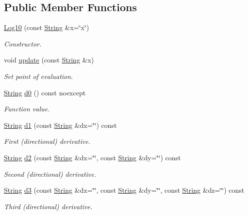 \subsection*{Public Member Functions}
\begin{DoxyCompactItemize}
\item 
\hyperlink{structFunG_1_1stringify_1_1Log10_adc0f9f883d5440b9b830de1fdb829d62}{Log10} (const \hyperlink{structFunG_1_1String}{String} \&x=\char`\"{}x\char`\"{})
\begin{DoxyCompactList}\small\item\em Constructor. \end{DoxyCompactList}\item 
void \hyperlink{structFunG_1_1stringify_1_1Log10_aaedc5f1160972edcc2b482b724aee82c}{update} (const \hyperlink{structFunG_1_1String}{String} \&x)
\begin{DoxyCompactList}\small\item\em Set point of evaluation. \end{DoxyCompactList}\item 
\hyperlink{structFunG_1_1String}{String} \hyperlink{structFunG_1_1stringify_1_1Log10_a839d0fc542d77763aedd53de85d44def}{d0} () const noexcept
\begin{DoxyCompactList}\small\item\em Function value. \end{DoxyCompactList}\item 
\hyperlink{structFunG_1_1String}{String} \hyperlink{structFunG_1_1stringify_1_1Log10_a9fcef111ed931e1f5172bda7d43618dd}{d1} (const \hyperlink{structFunG_1_1String}{String} \&dx=\char`\"{}\char`\"{}) const 
\begin{DoxyCompactList}\small\item\em First (directional) derivative. \end{DoxyCompactList}\item 
\hyperlink{structFunG_1_1String}{String} \hyperlink{structFunG_1_1stringify_1_1Log10_a798f87fe876c1953b87328794563c4cb}{d2} (const \hyperlink{structFunG_1_1String}{String} \&dx=\char`\"{}\char`\"{}, const \hyperlink{structFunG_1_1String}{String} \&dy=\char`\"{}\char`\"{}) const 
\begin{DoxyCompactList}\small\item\em Second (directional) derivative. \end{DoxyCompactList}\item 
\hyperlink{structFunG_1_1String}{String} \hyperlink{structFunG_1_1stringify_1_1Log10_a93a28b93452a8a1486bf002078fe5cdb}{d3} (const \hyperlink{structFunG_1_1String}{String} \&dx=\char`\"{}\char`\"{}, const \hyperlink{structFunG_1_1String}{String} \&dy=\char`\"{}\char`\"{}, const \hyperlink{structFunG_1_1String}{String} \&dz=\char`\"{}\char`\"{}) const 
\begin{DoxyCompactList}\small\item\em Third (directional) derivative. \end{DoxyCompactList}\end{DoxyCompactItemize}


